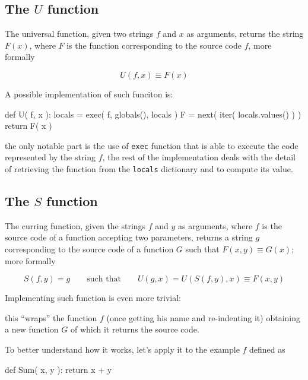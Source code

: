 \documentclass[a4paper]{article}
\begin{document}
\subsection*{The $U$ function}

The universal function, given two strings $f$ and $x$ as arguments, returns
the string $F(x)$, where $F$ is the function corresponding to the source code
$f$, more formally

\[
  U( f, x ) \equiv F( x )
\]

A possible implementation of such funciton is:

\begin{pycode}
def U( f, x ):
  locals = {}
  exec( f, globals(), locals )
  F = next( iter( locals.values() ) )
  return F( x )
\end{pycode}

the only notable part is the use of \verb|exec| function that is able to
execute the code represented by the string $f$, the rest of the implementation
deals with the detail of retrieving the function from the \verb|locals|
dictionary and to compute its value.

\subsection*{The $S$ function}

The curring function, given the strings $f$ and $y$ as arguments, where $f$ is
the source code of a function accepting two parameters, returns a string $g$
corresponding to the source code of a function $G$ such that $F(x,y) \equiv
G(x)$; more formally

\[
  S( f, y ) = g \qquad\text{such that}\qquad U( g, x ) = U( S( f, y ), x ) \equiv F( x, y )
\]

Implementing such function is even more trivial:


this ``wraps'' the function $f$ (once getting his name and re-indenting it)
obtaining a new function $G$ of which it returns the source code.

To better understand how it works, let's apply it to the example $f$ defined as

\begin{pycode}
def Sum( x, y ):
	return x + y
\end{pycode}
\end{document}
